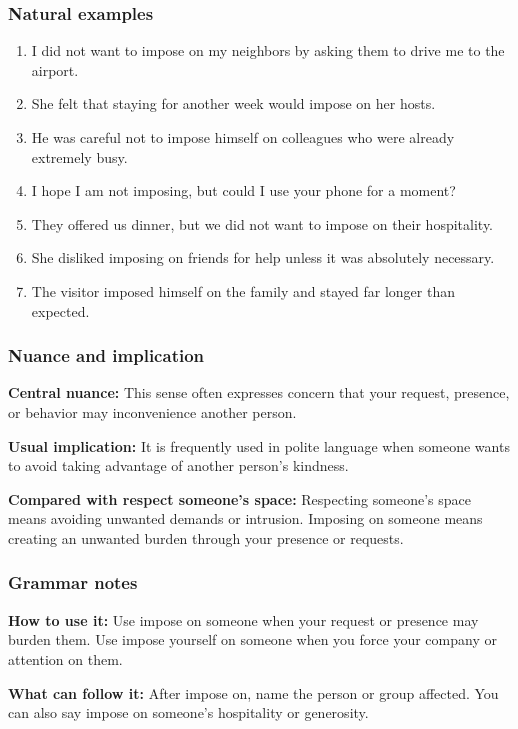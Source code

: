 \documentclass[11pt]{article}
\begin{document}
\subsubsection{Natural examples}
\begin{enumerate}
  \item I did not want to impose on my neighbors by asking them to drive me to the airport.
  \item She felt that staying for another week would impose on her hosts.
  \item He was careful not to impose himself on colleagues who were already extremely busy.
  \item I hope I am not imposing, but could I use your phone for a moment?
  \item They offered us dinner, but we did not want to impose on their hospitality.
  \item She disliked imposing on friends for help unless it was absolutely necessary.
  \item The visitor imposed himself on the family and stayed far longer than expected.
\end{enumerate}

\subsubsection{Nuance and implication}
\textbf{Central nuance:} This sense often expresses concern that your request, presence, or behavior may inconvenience another person.

\textbf{Usual implication:} It is frequently used in polite language when someone wants to avoid taking advantage of another person's kindness.

\textbf{Compared with respect someone's space:} Respecting someone's space means avoiding unwanted demands or intrusion. Imposing on someone means creating an unwanted burden through your presence or requests.

\subsubsection{Grammar notes}
\textbf{How to use it:} Use impose on someone when your request or presence may burden them. Use impose yourself on someone when you force your company or attention on them.

\textbf{What can follow it:} After impose on, name the person or group affected. You can also say impose on someone's hospitality or generosity.
\end{document}
